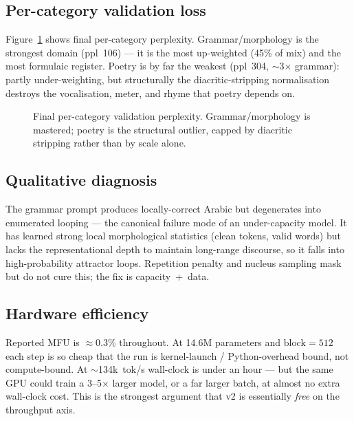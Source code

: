 \documentclass[10pt,twocolumn]{article}
\begin{document}
\subsection{Per-category validation loss}
Figure~\ref{fig:cat} shows final per-category perplexity. Grammar/morphology is
the strongest domain (ppl~106) --- it is the most up-weighted (45\% of mix) and
the most formulaic register. Poetry is by far the weakest (ppl~304, $\sim$3$\times$
grammar): partly under-weighting, but structurally the diacritic-stripping
normalisation destroys the vocalisation, meter, and rhyme that poetry depends on.

\begin{figure}[t]
\centering
{}
\caption{Final per-category validation perplexity. Grammar/morphology is
mastered; poetry is the structural outlier, capped by diacritic stripping rather
than by scale alone.}
\label{fig:cat}
\end{figure}

\subsection{Qualitative diagnosis}
The grammar prompt produces locally-correct Arabic but degenerates into
enumerated looping --- the canonical failure mode of an under-capacity model. It
has learned strong local morphological statistics (clean tokens, valid words) but
lacks the representational depth to maintain long-range discourse, so it falls
into high-probability attractor loops. Repetition penalty and nucleus sampling
mask but do not cure this; the fix is capacity~+~data.

\subsection{Hardware efficiency}
Reported MFU is $\approx$0.3\% throughout. At 14.6M parameters and
$\text{block}{=}512$ each step is so cheap that the run is kernel-launch /
Python-overhead bound, not compute-bound. At $\sim$134k~tok/s wall-clock is under
an hour --- but the same GPU could train a 3--5$\times$ larger model, or a far
larger batch, at almost no extra wall-clock cost. This is the strongest argument
that v2 is essentially \emph{free} on the throughput axis.
\end{document}
